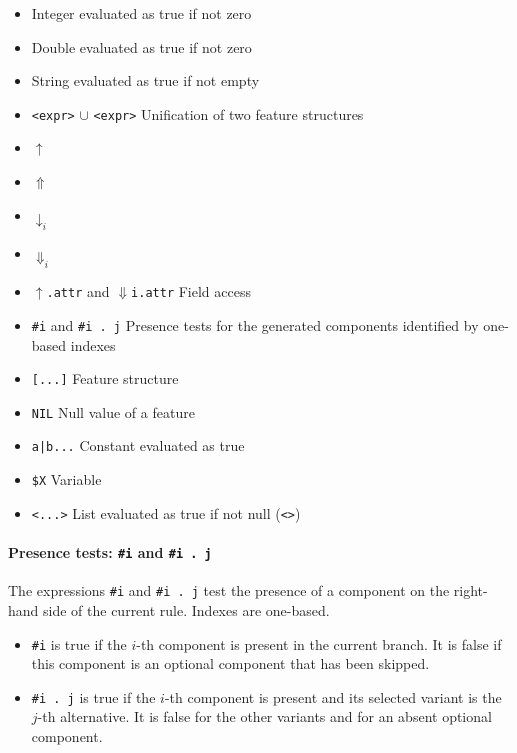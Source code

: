 \documentclass[11pt]{article}
\begin{document}
\begin{itemize}
	      \begin{itemize}
		      \item Integer evaluated as true if not zero
		      \item Double evaluated as true if not zero
		      \item String evaluated as true if not empty
		      \item \verb#<expr>#  $\cup$ \verb#<expr># Unification of two
		            feature structures
		      \item $\uparrow$
		      \item $\Uparrow$
		      \item $\downarrow_i$
		      \item $\Downarrow_i$
		      \item $\uparrow$\verb#.attr# and $\Downarrow$\verb#i.attr# Field access
		      \item \verb|#i| and \verb|#i . j| Presence tests for the generated
		            components identified by one-based indexes
		      \item \verb#[...]# Feature structure
		      \item \verb#NIL# Null value of a feature
		      \item \verb#a|b...# Constant evaluated as true
		      \item \verb#$X# Variable
		      \item \verb#<...># List evaluated as true if not null (\verb#<>#)
	      \end{itemize}

\paragraph{Presence tests: \texttt{\#i} and \texttt{\#i . j}}

The expressions \verb|#i| and \verb|#i . j| test the presence of a component on
the right-hand side of the current rule. Indexes are one-based.

\begin{itemize}
	\item \verb|#i| is true if the $i$-th component is present in the current
	      branch. It is false if this component is an optional component that
	      has been skipped.
	\item \verb|#i . j| is true if the $i$-th component is present and its
	      selected variant is the $j$-th alternative. It is false for the other
	      variants and for an absent optional component.
\end{itemize}


\end{itemize}
\end{document}
